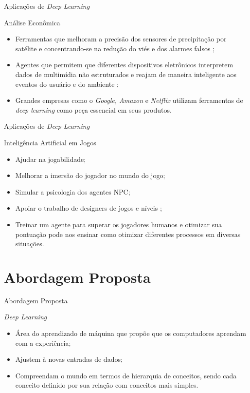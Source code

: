 \documentclass[aspectratio=169]{beamer}
\begin{document}
\begin{frame}{Aplicações de \textit{Deep Learning}}
	\begin{block}{Análise Econômica}
		\begin{itemize}
			\item Ferramentas que melhoram a precisão dos sensores de precipitação por satélite e concentrando-se na redução do viés e dos alarmes falsos \cite{doi:10.1175/JHM-D-15-0075.1};
			\item Agentes que permitem que diferentes dispositivos eletrônicos interpretem dados de multimídia não estruturados e reajam de maneira inteligente aos eventos do usuário e do ambiente \cite{dl-IoT};
			\item Grandes empresas como o \textit{Google, Amazon} e \textit{Netflix} utilizam ferramentas de \textit{deep learning} como peça essencial em seus produtos.
		\end{itemize}
	\end{block}
\end{frame}
\begin{frame}{Aplicações de \textit{Deep Learning}}
	\begin{block}{Inteligência Artificial em Jogos}
		\begin{itemize}
			\item Ajudar na jogabilidade;
			\item Melhorar a imersão do jogador no mundo do jogo;
			\item Simular a psicologia dos agentes NPC;
			\item Apoiar o trabalho de designers de jogos e níveis \cite{Piergigli:drl:2019};
			\item Treinar um agente para superar os jogadores humanos e otimizar sua pontuação pode nos ensinar como otimizar diferentes processos em diversas situações.
		\end{itemize}
	\end{block}
\end{frame}
\section{Abordagem Proposta}

\begin{frame}{Abordagem Proposta}
	\begin{block}{\textit{Deep Learning}}
		\begin{itemize}
			\item Área do aprendizado de máquina que propõe que os computadores aprendam com a experiência;
			\item Ajustem à novas entradas de dados;
			\item Compreendam o mundo em termos de hierarquia de conceitos, sendo cada conceito definido por sua relação com conceitos mais simples.
		\end{itemize}
	\end{block}
\end{frame}
\end{document}
